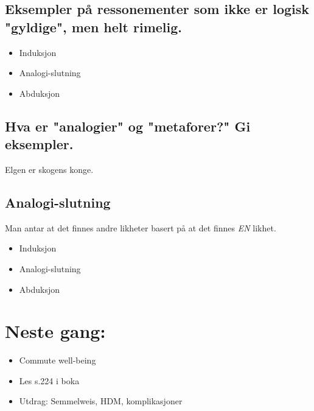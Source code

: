\documentclass[11pt]{article}
\begin{document}
\subsection{Eksempler på ressonementer som ikke er logisk "gyldige", men helt rimelig.}
\begin{itemize}
\item{Induksjon}
\item{Analogi-slutning}
\item{Abduksjon}
\end{itemize}

\subsection{Hva er "analogier" og "metaforer?" Gi eksempler.}
Elgen er skogens konge.

\subsection{Analogi-slutning}
Man antar at det finnes andre likheter basert på at det finnes \emph{EN} likhet.

\begin{itemize}
\item{Induksjon}
\item{Analogi-slutning}
\item{Abduksjon}
\end{itemize}

\section{Neste gang:}
\begin{itemize}
\item{Commute well-being}
\item{Les s.224 i boka}
\item{Utdrag: Semmelweis, HDM, komplikasjoner}

\end{itemize}
\end{document}
